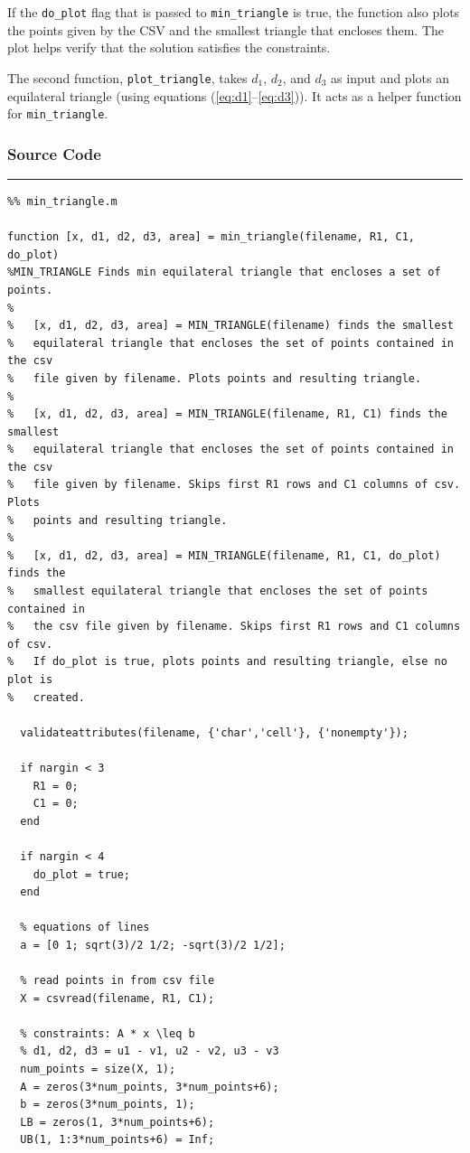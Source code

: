\documentclass{article}
\begin{document}
\noindent If the \texttt{do\_plot} flag that is passed to \texttt{min\_triangle} is true, the function also plots the points given by the CSV and the smallest triangle that encloses them.
The plot helps verify that the solution satisfies the constraints.

The second function, \texttt{plot\_triangle}, takes $d_1$, $d_2$, and $d_3$ as input and plots an equilateral triangle (using equations (\ref{eq:d1}--\ref{eq:d3})).
It acts as a helper function for \texttt{min\_triangle}.

\subsubsection{Source Code}
\vspace{0.25in}
\hrule
\begin{lstlisting}
%% min_triangle.m

function [x, d1, d2, d3, area] = min_triangle(filename, R1, C1, do_plot)
%MIN_TRIANGLE Finds min equilateral triangle that encloses a set of points.
%
%   [x, d1, d2, d3, area] = MIN_TRIANGLE(filename) finds the smallest
%   equilateral triangle that encloses the set of points contained in the csv
%   file given by filename. Plots points and resulting triangle.
%
%   [x, d1, d2, d3, area] = MIN_TRIANGLE(filename, R1, C1) finds the smallest
%   equilateral triangle that encloses the set of points contained in the csv
%   file given by filename. Skips first R1 rows and C1 columns of csv. Plots
%   points and resulting triangle.
%
%   [x, d1, d2, d3, area] = MIN_TRIANGLE(filename, R1, C1, do_plot) finds the 
%   smallest equilateral triangle that encloses the set of points contained in 
%   the csv file given by filename. Skips first R1 rows and C1 columns of csv.
%   If do_plot is true, plots points and resulting triangle, else no plot is
%   created.

  validateattributes(filename, {'char','cell'}, {'nonempty'});
  
  if nargin < 3
    R1 = 0;
    C1 = 0;
  end
  
  if nargin < 4
    do_plot = true;
  end
  
  % equations of lines
  a = [0 1; sqrt(3)/2 1/2; -sqrt(3)/2 1/2];
  
  % read points in from csv file
  X = csvread(filename, R1, C1);
  
  % constraints: A * x \leq b
  % d1, d2, d3 = u1 - v1, u2 - v2, u3 - v3
  num_points = size(X, 1);
  A = zeros(3*num_points, 3*num_points+6);
  b = zeros(3*num_points, 1);
  LB = zeros(1, 3*num_points+6);
  UB(1, 1:3*num_points+6) = Inf;
  

\end{lstlisting}
\end{document}
